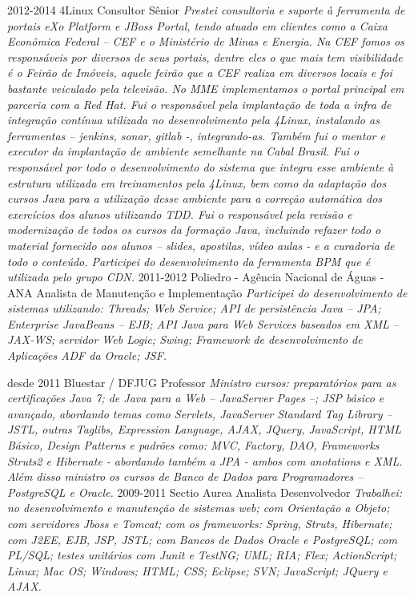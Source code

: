 \begin{entrylist}
  \entry
    {2012-2014}
    {4Linux}
    {Consultor Sênior}
    {\emph{Prestei consultoria e suporte à ferramenta de portais eXo Platform e JBoss Portal, tendo atuado em clientes como a Caixa Econômica Federal – CEF e o Ministério de Minas e Energia.
    Na CEF fomos os responsáveis por diversos de seus portais, dentre eles o que mais tem visibilidade é o Feirão de Imóveis, aquele feirão que a CEF realiza em diversos locais e foi bastante veiculado pela televisão. No MME implementamos o portal principal em parceria com a Red Hat.
Fui o responsável pela implantação de toda a infra de integração contínua utilizada no desenvolvimento pela 4Linux, instalando as ferramentas – jenkins, sonar, gitlab -, integrando-as.
Também fui o mentor e executor da implantação de ambiente semelhante na Cabal Brasil.
Fui o responsável por todo o desenvolvimento do sistema que integra esse ambiente à estrutura utilizada em treinamentos pela 4Linux, bem como da adaptação dos cursos Java para a utilização desse ambiente para a correção automática dos exercícios dos alunos utilizando TDD.
Fui o responsável pela revisão e modernização de todos os cursos da formação Java, incluindo refazer todo o material fornecido aos alunos – slides, apostilas, vídeo aulas - e a curadoria de todo o conteúdo.
Participei do desenvolvimento da ferramenta BPM que é utilizada pelo grupo CDN.}}
  \entry
    {2011-2012}
    {Poliedro - Agência Nacional de Águas - ANA}
    {Analista de Manutenção e Implementação}
    {\emph{Participei do desenvolvimento de sistemas utilizando: Threads; Web Service;  API de persistência Java – JPA; Enterprise JavaBeans – EJB; API Java para Web Services baseados em XML – JAX-WS; servidor Web Logic; Swing; Framework de desenvolvimento de Aplicações ADF da Oracle; JSF.}}
\end{entrylist}

\newpage

\begin{entrylist}
  \entry
    {desde 2011}
    {Bluestar / DFJUG}
    {Professor}
    {\emph{Ministro cursos: preparatórios para as certificações Java 7; de Java para a Web – JavaServer Pages –; JSP básico e avançado, abordando temas como Servlets, JavaServer Standard Tag Library – JSTL, outras Taglibs, Expression Language, AJAX, JQuery, JavaScript, HTML Básico, Design
    Patterns e padrões como: MVC, Factory, DAO,
    Frameworks Struts2 e Hibernate - abordando também a JPA - ambos com anotations e XML. Além disso ministro os cursos de Banco de Dados para Programadores – PostgreSQL e Oracle.}}
  \entry
    {2009-2011}
    {Sectio Aurea}
    {Analista Desenvolvedor}
    {\emph{Trabalhei: no desenvolvimento e manutenção de sistemas web; com Orientação a Objeto; com servidores Jboss e Tomcat; com os frameworks: Spring, Struts, Hibernate; com J2EE, EJB, JSP, JSTL; com Bancos de Dados Oracle e PostgreSQL; com PL/SQL; testes unitários com Junit e TestNG; UML; RIA; Flex; ActionScript; Linux; Mac OS; Windows; HTML; CSS; Eclipse; SVN; JavaScript; JQuery e AJAX.}}
\end{entrylist}

